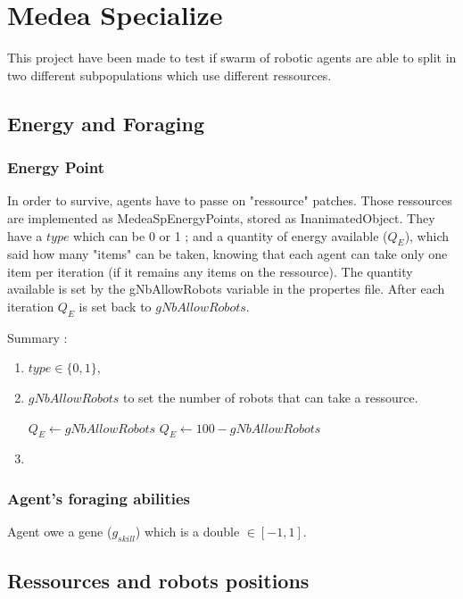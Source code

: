 \documentclass[a4paper,10pt]{report}
\title{}
\author{simon}
\begin{document}
\chapter{Medea Specialize}

This project have been made to test if swarm of robotic agents are able to split in two different subpopulations which use different ressources.


\section{Energy and Foraging}


\subsection{Energy Point}
In order to survive, agents have to passe on "ressource" patches. Those ressources are implemented as MedeaSpEnergyPoints, stored as InanimatedObject. They have a $type$ which can be 0 or 1 ; and a quantity of energy available ($Q_E$), which said how many "items" can be taken, knowing that each agent can take only one item per iteration (if it remains any items on the ressource). The quantity available is set by the gNbAllowRobots variable in the propertes file. After each iteration $Q_E$ is set back to $gNbAllowRobots$.

Summary :
\begin{enumerate}
 \item $type \in \{0,1\}$,
 \item $gNbAllowRobots$ to set the number of robots that can take a ressource. 
 \begin{algorithmic}
 \STATE $ Q_E \leftarrow gNbAllowRobots $ 
 \ELSE 
 \STATE $Q_E \leftarrow 100 - gNbAllowRobots$
 \ENDIF
 \end{algorithmic}
 \item 
 
\end{enumerate}


\subsection{Agent's foraging abilities}
Agent owe a gene ($g_{skill}$) which is a double $\in\left[-1,1\right]$.




\section{Ressources and robots positions}
\end{document}
